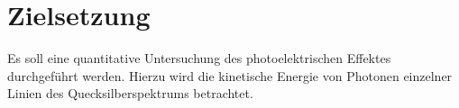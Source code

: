 
\section{Zielsetzung}
\label{sec:Zielsetzung}
Es soll eine quantitative Untersuchung des photoelektrischen Effektes durchgeführt werden.
Hierzu wird die kinetische Energie von Photonen einzelner Linien des Quecksilberspektrums
betrachtet.
